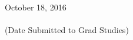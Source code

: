 
October 18, 2016 \\
\noindent\underline{\hspace{30em}} \\
(Date Submitted to Grad Studies)

\vspace{\linespace}






\normalsize